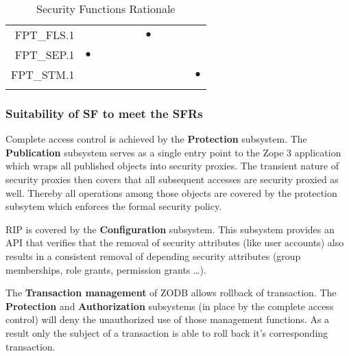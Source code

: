 \documentclass[12pt,english]{scrbook}
\newcommand{\oh}{$\bullet$}
\begin{document}
\begin{longtable}{rRRRRRRRRRR}
FPT\_FLS.1          &            &                &               &          &               &     \oh                &      &                    &                 &                    \\   
FPT\_SEP.1          &  \oh       &                &               &          &               &                        &      &                    &                 &                    \\ 
FPT\_STM.1          &            &                &               &          &               &                        &      &                    &                 &   \oh              \\       
    \bottomrule
    \caption{Security Functions Rationale} %

\end{longtable}

\subsubsection{Suitability of SF to meet the SFRs}


Complete access control is achieved by the \textbf{Protection} subsystem. The
\textbf{Publication} subsystem serves as a single entry point to the Zope 3
application which wraps all published objects into security proxies. The
transient nature of security proxies then covers that all subsequent accesses
are security proxied as well. Thereby all operations among those objects are
covered by the protection subsytem which enforces the formal security policy.


RIP is covered by the \textbf{Configuration} subsystem. This subsystem provides
an API that verifies that the removal of security attributes (like user
accounts) also results in a consistent removal of depending security attributes
(group memberships, role grants, permission grants \ldots).


The \textbf{Transaction management} of ZODB allows rollback of transaction. The
\textbf{Protection} and \textbf{Authorization} subsystems (in place by the
complete access control) will deny the unauthorized use of those management
functions. As a result only the subject of a transaction is able to roll back
it's corresponding transaction.
\end{document}
